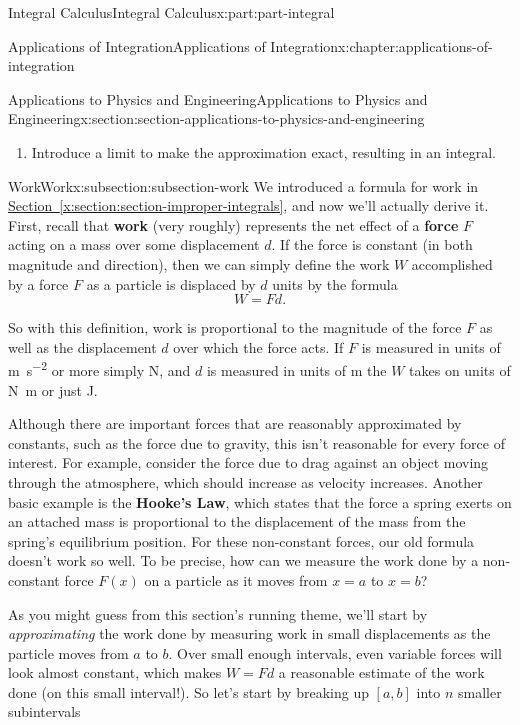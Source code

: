 \documentclass[twoside,10pt,]{tufte-book}
\newcommand{\xreffont}{\relax}
\newcommand{\terminology}[1]{\textbf{#1}}
\numberwithin{equation}{part}
\begin{document}
\begin{partptx}{Integral Calculus}{}{Integral Calculus}{}{}{x:part:part-integral}
\begin{chapterptx}{Applications of Integration}{}{Applications of Integration}{}{}{x:chapter:applications-of-integration}
\begin{sectionptx}{Applications to Physics and Engineering}{}{Applications to Physics and Engineering}{}{}{x:section:section-applications-to-physics-and-engineering}
\begin{introduction}{}
\begin{enumerate}
\item{}Introduce a limit to make the approximation exact, resulting in an integral.%
\end{enumerate}
\end{introduction}%
%
%
\typeout{************************************************}
\typeout{************************************************}
%
\begin{subsectionptx}{Work}{}{Work}{}{}{x:subsection:subsection-work}
We introduced a formula for work in \hyperref[x:section:section-improper-integrals]{Section~{\xreffont\ref{x:section:section-improper-integrals}}}, and now we'll actually derive it. First, recall that \terminology{work} (very roughly) represents the net effect of a \terminology{force} \(F\) acting on a mass over some displacement \(d\). If the force is constant (in both magnitude and direction), then we can simply define the work \(W\) accomplished by a force \(F\) as a particle is displaced by \(d\) units by the formula%
\begin{equation*}
W = Fd.
\end{equation*}
%
\par
So with this definition, work is proportional to the magnitude of the force \(F\) as well as the displacement \(d\) over which the force acts. If \(F\) is measured in units of \si{\meter\per\second\tothe{2}} or more simply \si{\newton}, and \(d\) is measured in units of \si{\meter} the \(W\) takes on units of \si{\newton\meter} or just \si{\joule}.%
\par
Although there are important forces that are reasonably approximated by constants, such as the force due to gravity, this isn't reasonable for every force of interest. For example, consider the force due to drag against an object moving through the atmosphere, which should increase as velocity increases. Another basic example is the \terminology{Hooke's Law}, which states that the force a spring exerts on an attached mass is proportional to the displacement of the mass from the spring's equilibrium position. For these non-constant forces, our old formula doesn't work so well. To be precise, how can we measure the work done by a non-constant force \(F(x)\) on a particle as it moves from \(x = a\) to \(x = b\)?%
\par
As you might guess from this section's running theme, we'll start by \emph{approximating} the work done by measuring work in small displacements as the particle moves from \(a\) to \(b\). Over small enough intervals, even variable forces will look almost constant, which makes \(W = Fd\) a reasonable estimate of the work done (on this small interval!). So let's start by breaking up \([a,b]\) into \(n\) smaller subintervals%

\end{subsectionptx}
\end{sectionptx}
\end{chapterptx}
\end{partptx}
\end{document}
